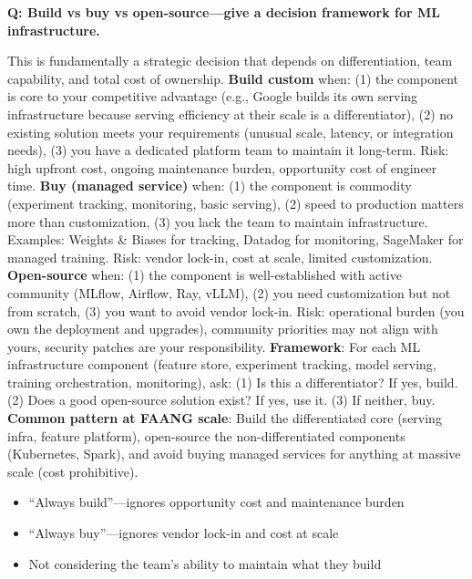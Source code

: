 \begin{interviewq}
\textbf{Q: Build vs buy vs open-source---give a decision framework for ML infrastructure.}

 \quad {} \quad \badgefreq{\freqmed}

\stronganswer This is fundamentally a strategic decision that depends on differentiation, team capability, and total cost of ownership. \textbf{Build custom} when: (1) the component is core to your competitive advantage (e.g., Google builds its own serving infrastructure because serving efficiency at their scale is a differentiator), (2) no existing solution meets your requirements (unusual scale, latency, or integration needs), (3) you have a dedicated platform team to maintain it long-term. Risk: high upfront cost, ongoing maintenance burden, opportunity cost of engineer time. \textbf{Buy (managed service)} when: (1) the component is commodity (experiment tracking, monitoring, basic serving), (2) speed to production matters more than customization, (3) you lack the team to maintain infrastructure. Examples: Weights \& Biases for tracking, Datadog for monitoring, SageMaker for managed training. Risk: vendor lock-in, cost at scale, limited customization. \textbf{Open-source} when: (1) the component is well-established with active community (MLflow, Airflow, Ray, vLLM), (2) you need customization but not from scratch, (3) you want to avoid vendor lock-in. Risk: operational burden (you own the deployment and upgrades), community priorities may not align with yours, security patches are your responsibility. \textbf{Framework}: For each ML infrastructure component (feature store, experiment tracking, model serving, training orchestration, monitoring), ask: (1) Is this a differentiator? If yes, build. (2) Does a good open-source solution exist? If yes, use it. (3) If neither, buy. \textbf{Common pattern at FAANG scale}: Build the differentiated core (serving infra, feature platform), open-source the non-differentiated components (Kubernetes, Spark), and avoid buying managed services for anything at massive scale (cost prohibitive).

\redflags
\begin{itemize}
    \item ``Always build''---ignores opportunity cost and maintenance burden
    \item ``Always buy''---ignores vendor lock-in and cost at scale
    \item Not considering the team's ability to maintain what they build
\end{itemize}


\end{interviewq}
